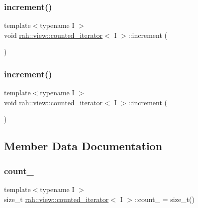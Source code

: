 \subsubsection{\texorpdfstring{increment()}{increment()}\hspace{0.1cm}{\footnotesize\ttfamily [1/2]}}
{\footnotesize\ttfamily template$<$typename I $>$ \\
void \mbox{\hyperlink{structrah_1_1view_1_1counted__iterator}{rah\+::view\+::counted\+\_\+iterator}}$<$ I $>$\+::increment (\begin{DoxyParamCaption}{ }\end{DoxyParamCaption})\hspace{0.3cm}{\ttfamily [inline]}}

\mbox{\label{structrah_1_1view_1_1counted__iterator_a8113f67743f49650c0b4c872bcfd560e}} 
\subsubsection{\texorpdfstring{increment()}{increment()}\hspace{0.1cm}{\footnotesize\ttfamily [2/2]}}
{\footnotesize\ttfamily template$<$typename I $>$ \\
void \mbox{\hyperlink{structrah_1_1view_1_1counted__iterator}{rah\+::view\+::counted\+\_\+iterator}}$<$ I $>$\+::increment (\begin{DoxyParamCaption}{ }\end{DoxyParamCaption})\hspace{0.3cm}{\ttfamily [inline]}}



\subsection{Member Data Documentation}
\mbox{\label{structrah_1_1view_1_1counted__iterator_a235949f8f72f083b6a65e6f385327d42}} 
\subsubsection{\texorpdfstring{count\_}{count\_}}
{\footnotesize\ttfamily template$<$typename I $>$ \\
size\+\_\+t \mbox{\hyperlink{structrah_1_1view_1_1counted__iterator}{rah\+::view\+::counted\+\_\+iterator}}$<$ I $>$\+::count\+\_\+ = size\+\_\+t()}

